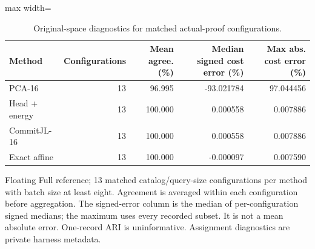 \begin{table}[tp]
\caption{Original-space diagnostics for matched actual-proof configurations.}\label{tab:cost-error}
\centering\small
\begin{adjustbox}{max width=\textwidth}
\begin{tabular}{@{}lrrrr@{}}
\toprule
Method & Configurations & Mean agree. (\%) & Median signed cost error (\%) & Max abs. cost error (\%) \\
\midrule
PCA-16 & 13 & 96.995 & -93.021784 & 97.044456 \\
Head + energy & 13 & 100.000 & 0.000558 & 0.007886 \\
CommitJL-16 & 13 & 100.000 & 0.000558 & 0.007886 \\
Exact affine & 13 & 100.000 & -0.000097 & 0.007590 \\
\bottomrule
\end{tabular}
\end{adjustbox}
\par\vspace{3pt}\begin{minipage}{0.98\textwidth}\footnotesize Floating Full reference; 13 matched catalog/query-size configurations per method with batch size at least eight. Agreement is averaged within each configuration before aggregation. The signed-error column is the median of per-configuration signed medians; the maximum uses every recorded subset. It is not a mean absolute error. One-record ARI is uninformative. Assignment diagnostics are private harness metadata.\end{minipage}
\end{table}
